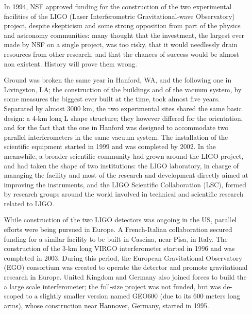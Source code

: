 


In 1994, NSF approved funding for the construction of the two experimental facilities 
of the LIGO (Laser Interferometric Gravitational-wave Observatory) project, despite 
skepticism and some strong opposition from part of the physics and astronomy 
communities: many thought that the investment, the largest ever made by NSF on a 
single project, was too risky, that it would needlessly drain resources from other 
research, and that the chances of success would be almost non existent. History will prove them wrong.

Ground was broken the same year in Hanford, WA, and the following one in Livingston, LA; 
the construction of the buildings and of the vacuum system, by some measures the biggest 
ever built at the time, took almost five years. Separated by almost 3000 km, the two 
experimental sites shared the same basic design: a 4-km long L shape structure; they 
however differed for the orientation, and for the fact that the one in Hanford was 
designed to accommodate two parallel interferometers in the same vacuum system. 
The installation of the scientific equipment started in 1999 and was completed by 2002. 
In the meanwhile, a broader scientific community had grown around the LIGO project, 
and had taken the shape of two institutions: the LIGO laboratory, in charge of managing 
the facility and most of the research and development directly aimed at improving the 
instruments, and the LIGO Scientific Collaboration (LSC), formed by research groups 
around the world involved in technical and scientific research related to LIGO.

While construction of the two LIGO detectors was ongoing in the US, parallel efforts 
were being pursued in Europe. A French-Italian collaboration secured funding for a 
similar facility to be built in Cascina, near Pisa, in Italy. The construction of the 3-km 
long VIRGO interferometer started in 1996 and was completed in 2003. During this period, 
the European Gravitational Observatory (EGO) consortium was created to operate the detector 
and promote gravitational research in Europe. United Kingdom and Germany also joined 
forces to build the a large scale interferometer; the full-size project was not funded, but 
was de-scoped to a slightly smaller version named GEO600 (due to its 600 meters long arms), 
whose construction near Hannover, Germany, started in 1995.

